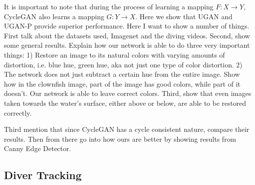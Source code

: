 \documentclass[conference,reqno]{IEEEtran}
\begin{document}
It is important to note that during the process of learning a mapping $F: X \rightarrow Y$, CycleGAN also learns a
mapping $G: Y \rightarrow X$. Here we show that UGAN and UGAN-P provide superior performance.
Here I want to show a number of things. First talk about the datasets used, Imagenet and the diving videos.
Second, show some general results. Explain how our network is able to do three very important things: 1) Restore an
image to its natural colors with varying amounts of distortion, i.e. blue hue, green hue, aka not just one type of
color distortion. 2) The network does not just subtract a certain hue from the entire image. Show how in the clownfish
image, part of the image has good colors, while part of it doesn't. Our network is able to leave correct colors. Third,
show that even images taken towards the water's surface, either above or below, are able to be restored correctly.

Third mention that since CycleGAN has a cycle consistent nature, compare their results. Then from there go into how
ours are better by showing results from Canny Edge Detector.

\subsection{Diver Tracking}
\end{document}
